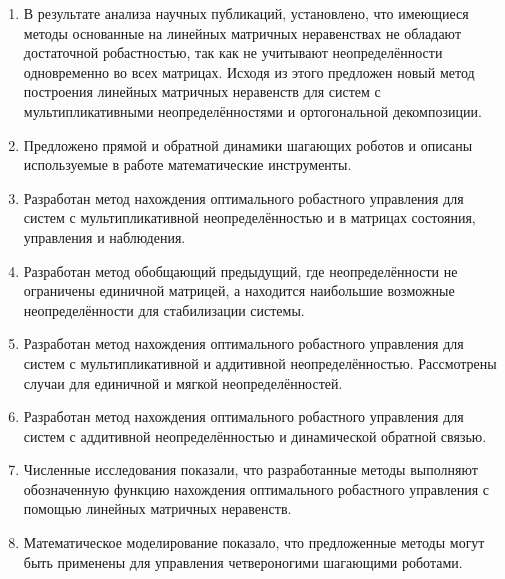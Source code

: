 \begin{enumerate}
  \item В результате анализа научных публикаций, установлено, что имеющиеся методы основанные на линейных матричных неравенствах не обладают достаточной робастностью, так как не учитывают неопределённости одновременно во всех матрицах. Исходя из этого предложен новый метод построения линейных матричных неравенств для систем с мультипликативными неопределённостями и ортогональной декомпозиции.  
  \item Предложено прямой и обратной динамики шагающих роботов и описаны используемые в работе математические инструменты.
  \item Разработан метод нахождения оптимального робастного управления для систем с мультипликативной неопределённостью и в матрицах состояния, управления и наблюдения. 
  \item Разработан метод обобщающий предыдущий, где неопределённости не ограничены единичной матрицей, а находится наибольшие возможные неопределённости для стабилизации системы.
  \item Разработан метод нахождения оптимального робастного управления для систем с мультипликативной и аддитивной неопределённостью. Рассмотрены случаи для единичной и мягкой неопределённостей.
  \item Разработан метод нахождения оптимального робастного управления для систем с аддитивной неопределённостью и динамической обратной связью.
  \item Численные исследования показали, что разработанные методы выполняют обозначенную функцию нахождения оптимального робастного управления с помощью линейных матричных неравенств.
  \item Математическое моделирование показало, что предложенные методы могут быть применены для управления четвероногими шагающими роботами. 
\end{enumerate}
